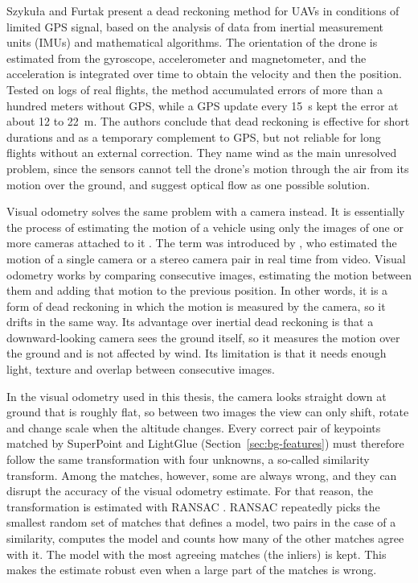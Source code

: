 \documentclass[english, Lau, oneside]{sapthesis}%
\begin{document}
Szyku{\l}a and Furtak \citeyearpar{szykula2025deadreckoning} present a dead reckoning method for UAVs in conditions of limited GPS signal, based on the analysis of data from inertial measurement units (IMUs) and mathematical algorithms. The orientation of the drone is estimated from the gyroscope, accelerometer and magnetometer, and the acceleration is integrated over time to obtain the velocity and then the position. Tested on logs of real flights, the method accumulated errors of more than a hundred meters without GPS, while a GPS update every 15~s kept the error at about 12 to 22~m. The authors conclude that dead reckoning is effective for short durations and as a temporary complement to GPS, but not reliable for long flights without an external correction. They name wind as the main unresolved problem, since the sensors cannot tell the drone's motion through the air from its motion over the ground, and suggest optical flow as one possible solution.

Visual odometry solves the same problem with a camera instead. It is essentially the process of estimating the motion of a vehicle using only the images of one or more cameras attached to it \citep{scaramuzza2011vo}. The term was introduced by \citet{nister2004vo}, who estimated the motion of a single camera or a stereo camera pair in real time from video. Visual odometry works by comparing consecutive images, estimating the motion between them and adding that motion to the previous position. In other words, it is a form of dead reckoning in which the motion is measured by the camera, so it drifts in the same way. Its advantage over inertial dead reckoning is that a downward-looking camera sees the ground itself, so it measures the motion over the ground and is not affected by wind. Its limitation is that it needs enough light, texture and overlap between consecutive images.

In the visual odometry used in this thesis, the camera looks straight down at ground that is roughly flat, so between two images the view can only shift, rotate and change scale when the altitude changes. Every correct pair of keypoints matched by SuperPoint and LightGlue (Section~\ref{sec:bg-features}) must therefore follow the same transformation with four unknowns, a so-called similarity transform. Among the matches, however, some are always wrong, and they can disrupt the accuracy of the visual odometry estimate. For that reason, the transformation is estimated with RANSAC \citep{fischler1981ransac}. RANSAC repeatedly picks the smallest random set of matches that defines a model, two pairs in the case of a similarity, computes the model and counts how many of the other matches agree with it. The model with the most agreeing matches (the inliers) is kept. This makes the estimate robust even when a large part of the matches is wrong.
\end{document}
